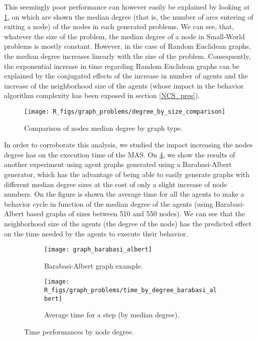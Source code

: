 This seemingly poor performance can however easily be explained by looking at \figurename{} \ref{degree_by_size}, on which are shown the median degree (that is, the number of arcs entering of exiting a node) of the nodes in each generated problems. We can see, that, whatever the size of the problem, the median degree of a node in Small-World problems is mostly constant. However, in the case of Random Euclidean graphs, the median degree increases linearly with the size of the problem. Consequently, the exponential increase in time regarding Random Euclidean graphs can be explained by the conjugated effects of the increase in number of agents and the increase of the neighborhood size of the agents (whose impact in the behavior algorithm complexity has been exposed in section \ref{NCS_pres}).

\begin{figure}
\centering
			\texttt{[image: R\_figs/graph\_problems/degree\_by\_size\_comparison]}
\caption{Comparison of nodes median degree by graph type.}\label{degree_by_size}
\end{figure}

In order to corroborate this analysis, we studied the impact increasing the nodes degree has on the execution time of the MAS. On \figurename{} \ref{experiment_degrees}, we show the results of another experiment using agent graphs generated using a Barabasi-Albert generator, which has the advantage of being able to easily generate graphs with different median degree sizes at the cost of only a slight increase of node numbers. On the figure is shown the average time for all the agents to make a behavior cycle in function of the median degree of the agents (using Barabasi-Albert based graphs of sizes between 510 and 550 nodes). We can see that the neighborhood size of the agents (the degree of the node) has the predicted effect on the time needed by the agents to execute their behavior.

\begin{figure}
\centering
	\begin{subfigure}[b]{0.45\textwidth}
		\texttt{[image: graph\_barabasi\_albert]}
		\caption{Barabasi-Albert graph example.}\label{experiment_degrees:graph}
	\end{subfigure}
	\begin{subfigure}[b]{0.45\textwidth}
			\texttt{[image: R\_figs/graph\_problems/time\_by\_degree\_barabasi\_albert]}
		\caption{Average time for a step (by median degree).}\label{experiment_degrees:res}
	\end{subfigure}
\caption{Time performances by node degree.}
\label{experiment_degrees}
\end{figure}

